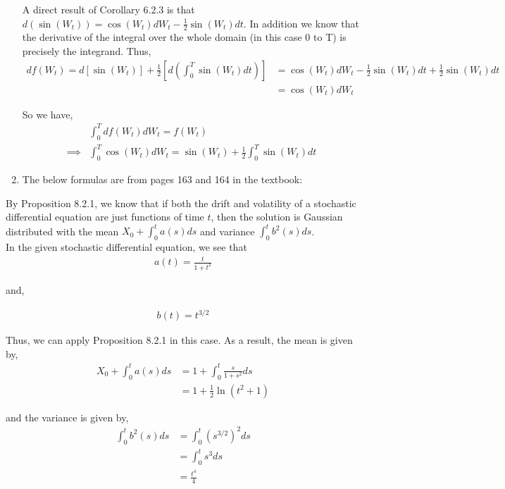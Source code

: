 \documentclass[12pt]{article}
\newenvironment{problem}[2][Problem]{\begin{trivlist}
\item[\hskip \labelsep {\bfseries #1}\hskip \labelsep {\bfseries #2.}]}{\end{trivlist}}
\begin{document}
\begin{enumerate}[\alph*)]
A direct result of Corollary 6.2.3 is that $d(\sin(W_t)) = \cos(W_t)dW_t - \frac{1}{2}\sin(W_t)dt$. In addition we know that the derivative of the integral over the whole domain (in this case 0 to T) is precisely the integrand. Thus,
\begin{align*}
d f(W_t) = d\left[\sin(W_t)\right] + \frac{1}{2} \left[ d\left(\int_0^T \sin(W_t)dt\right) \right] &= \cos(W_t)dW_t - \frac{1}{2}\sin(W_t)dt + \frac{1}{2}\sin(W_t)dt\\
&= \cos(W_t)dW_t
\end{align*}

So we have,
\begin{align*}
&\int_{0}^T df(W_t) dW_t = f(W_t)\\
\implies &\int_0^T \cos(W_t)dW_t = \sin(W_t) + \frac{1}{2} \int_0^T \sin(W_t) dt
\end{align*}

\item The below formulas are from pages 163 and 164 in the textbook:

\end{enumerate}

\begin{problem}{24}
\end{problem}

By Proposition 8.2.1, we know that if both the drift and volatility of a stochastic differential equation are just functions of time $t$, then the solution is Gaussian distributed with the mean $X_0 + \int_0^t a(s) ds$ and variance $\int_0^t b^2(s) ds$.\\

In the given stochastic differential equation, we see that
\begin{align*}
a(t) = \frac{t}{1+t^2}
\end{align*}

and,

\begin{align*}
b(t) = t^{3/2}
\end{align*}

Thus, we can apply Proposition 8.2.1 in this case. As a result, the mean is given by,
\begin{align*}
X_0 + \int_0^t a(s) ds &= 1 + \int_0^t \frac{s}{1 + s^2} ds\\
&= 1 + \frac{1}{2}\ln(t^2+1)
\end{align*}

and the variance is given by,
\begin{align*}
\int_0^t b^2(s) ds &= \int_0^t \left(s^{3/2}\right)^2 ds\\
&= \int_0^t s^3 ds\\
&= \frac{t^4}{4}
\end{align*}
\end{document}
